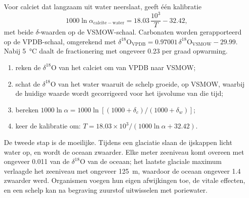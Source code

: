 Voor calciet dat langzaam uit water neerslaat, geeft één kalibratie
\[
1000\ln\alpha_{\mathrm{calcite-water}} = 18.03\,\frac{10^3}{T} - 32.42,
\]
met beide $\delta$-waarden op de VSMOW-schaal. Carbonaten worden gerapporteerd op de
VPDB-schaal, omgerekend met $\delta^{18}\mathrm O_{\mathrm{VPDB}} =
0.97001\,\delta^{18}\mathrm O_{\mathrm{VSMOW}} - 29.99$. Nabij \qty{5}{\celsius} daalt de
fractionering met ongeveer \qty{0.23}{\permil} per graad opwarming.

\begin{method}\label{met:b3:stable-isotopes:palaeotemperature}
\begin{enumerate}
\item reken de $\delta^{18}\mathrm O$ van het calciet om van VPDB naar VSMOW;
\item schat de $\delta^{18}\mathrm O$ van het water waaruit de schelp groeide, op
VSMOW, waarbij de huidige waarde wordt gecorrigeerd voor het ijsvolume van die tijd;
\item bereken $1000\ln\alpha = 1000\ln[(1000 + \delta_c)/(1000 + \delta_w)]$;
\item keer de kalibratie om: $T = 18.03\times10^3/(1000\ln\alpha + 32.42)$.
\end{enumerate}
\end{method}

De tweede stap is de moeilijke. Tijdens een glaciatie slaan de ijskappen
licht water op, en wordt de oceaan zwaarder. Elke meter zeeniveau komt overeen
met ongeveer \qty{0.011}{\permil} van de $\delta^{18}\mathrm O$ van de oceaan; het laatste glaciale
maximum verlaagde het zeeniveau met ongeveer \qty{125}{m}, waardoor de oceaan ongeveer
\qty{1.4}{\permil} zwaarder werd. Organismen voegen hun eigen afwijkingen toe, de vitale
effecten, en een schelp kan na begraving zuurstof uitwisselen met poriewater.

